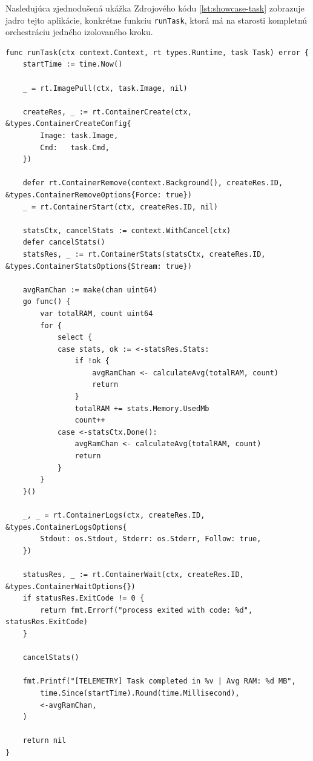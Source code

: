 \documentclass[
 program=infpvs,
  language=slovak,
  figures=false,
  tables=false,
  sourcecodes,
  glossaries,
  index
]{kidiplom}
\begin{document}
{Nasledujúca zjednodušená ukážka Zdrojového kódu \ref{lst:showcase-task} zobrazuje jadro tejto aplikácie, konkrétne funkciu \texttt{runTask}, ktorá má na starosti kompletnú orchestráciu jedného izolovaného kroku.

\begin{lstlisting}[caption={Vykonanie izolovanej úlohy s využitím knižnice.}, label={lst:showcase-task}]
func runTask(ctx context.Context, rt types.Runtime, task Task) error {
    startTime := time.Now()

    _ = rt.ImagePull(ctx, task.Image, nil) 
    
    createRes, _ := rt.ContainerCreate(ctx, &types.ContainerCreateConfig{
        Image: task.Image,
        Cmd:   task.Cmd,
    })
    
    defer rt.ContainerRemove(context.Background(), createRes.ID, &types.ContainerRemoveOptions{Force: true})
    _ = rt.ContainerStart(ctx, createRes.ID, nil)

    statsCtx, cancelStats := context.WithCancel(ctx)
    defer cancelStats()
    statsRes, _ := rt.ContainerStats(statsCtx, createRes.ID, &types.ContainerStatsOptions{Stream: true})

    avgRamChan := make(chan uint64)
    go func() {
        var totalRAM, count uint64
        for {
            select {
            case stats, ok := <-statsRes.Stats:
                if !ok {
                    avgRamChan <- calculateAvg(totalRAM, count)
                    return
                }
                totalRAM += stats.Memory.UsedMb
                count++
            case <-statsCtx.Done():
                avgRamChan <- calculateAvg(totalRAM, count)
                return
            }
        }
    }()

    _, _ = rt.ContainerLogs(ctx, createRes.ID, &types.ContainerLogsOptions{
        Stdout: os.Stdout, Stderr: os.Stderr, Follow: true,
    })

    statusRes, _ := rt.ContainerWait(ctx, createRes.ID, &types.ContainerWaitOptions{})
    if statusRes.ExitCode != 0 {
        return fmt.Errorf("process exited with code: %d", statusRes.ExitCode)
    }

    cancelStats()
    
    fmt.Printf("[TELEMETRY] Task completed in %v | Avg RAM: %d MB", 
        time.Since(startTime).Round(time.Millisecond), 
        <-avgRamChan,
    )

    return nil
}\end{lstlisting}



}
\end{document}
